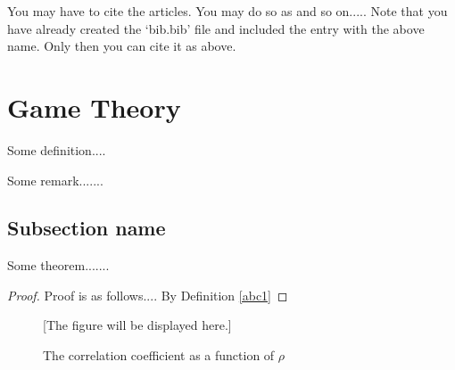 You may have to cite the articles.  You may do so as \cite{laan} and so on.....
Note that you have already created the `bib.bib' file and included the entry with the above name. Only
then you can cite it as above.

\section{Game Theory}
\begin{definition}\label{abc2}
Some definition....
\end{definition}

\begin{remark}
Some remark.......
\end{remark}

\subsection{Subsection name}

\begin{theorem}
Some theorem.......
\end{theorem}

\begin{proof}
Proof is as follows.... By Definition \ref{abc1}
\end{proof}


\begin{figure}[h]

[The figure will be displayed here.]

\caption{The correlation coefficient as a function of $\rho$}
\end{figure}


